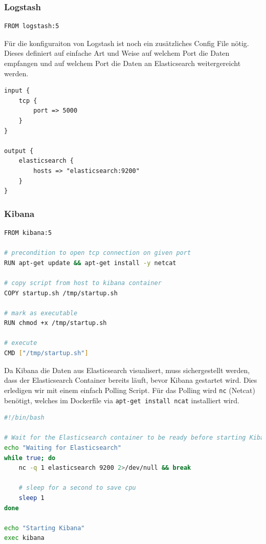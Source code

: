 \subsubsection{Logstash} 
\begin{lstlisting}[caption=Logstash Dockerfile, language=bash]
FROM logstash:5
\end{lstlisting}

Für die konfiguraiton von Logstash ist noch ein zusätzliches Config File nötig. Dieses definiert auf einfache Art und Weise auf welchem Port die Daten empfangen und auf welchem Port die Daten an Elasticsearch weitergereicht werden.
\begin{lstlisting}
input {
	tcp {
		port => 5000
	}
}

output {
	elasticsearch {
		hosts => "elasticsearch:9200"
	}
}
\end{lstlisting}

\subsubsection{Kibana} 
\begin{lstlisting}[caption=Kibana Dockerfile, language=bash]
FROM kibana:5

# precondition to open tcp connection on given port
RUN apt-get update && apt-get install -y netcat

# copy script from host to kibana container
COPY startup.sh /tmp/startup.sh

# mark as executable
RUN chmod +x /tmp/startup.sh 

# execute
CMD ["/tmp/startup.sh"] 
\end{lstlisting}

Da Kibana die Daten aus Elasticsearch visualisert, muss sichergestellt werden, dass der Elasticsearch Container bereits läuft, bevor Kibana gestartet wird. Dies erledigen wir mit einem einfach Polling Script. Für das Polling wird \lstinline[]|nc| (Netcat) benötigt, welches im Dockerfile via \lstinline[]|apt-get install ncat| installiert wird. 
\begin{lstlisting}[caption=Kibana Pooling Script, language=bash]
#!/bin/bash

# Wait for the Elasticsearch container to be ready before starting Kibana.
echo "Waiting for Elasticsearch"
while true; do
	nc -q 1 elasticsearch 9200 2>/dev/null && break
	
	# sleep for a second to save cpu
	sleep 1
done

echo "Starting Kibana"
exec kibana
\end{lstlisting}

